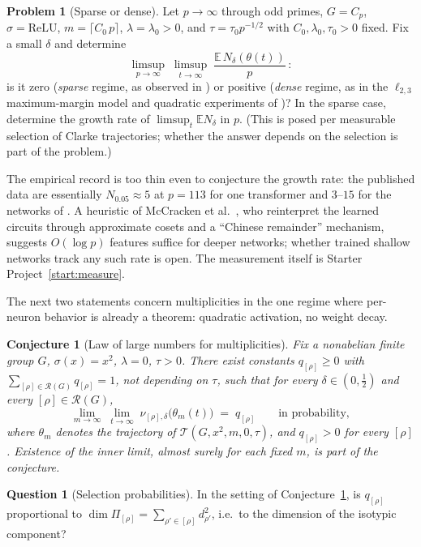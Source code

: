 \documentclass[11pt]{amsart}
\theoremstyle{plain}
\newtheorem{conjecture}[theorem]{Conjecture}
\theoremstyle{definition}
\newtheorem{problem}[theorem]{Problem}
\newtheorem{question}[theorem]{Question}
\newcommand{\E}{\mathbb{E}}
\newcommand{\Rcl}{\mathcal{R}}
\begin{document}
\begin{problem}[Sparse or dense]\label{prob:sparse}
Let $p\to\infty$ through odd primes, $G = C_p$, $\sigma = \mathrm{ReLU}$, $m = \lceil C_0\, p \rceil$, $\lambda = \lambda_0 > 0$, and $\tau = \tau_0 p^{-1/2}$ with $C_0,\lambda_0,\tau_0>0$ fixed. Fix a small $\delta$ and determine
\[
   \limsup_{p \to \infty} \; \limsup_{t \to \infty} \; \frac{\E\, N_\delta(\theta(t))}{p}\,:
\]
is it zero (\emph{sparse} regime, as observed in \cite{nanda2023,chughtai2023}) or positive (\emph{dense} regime, as in the $\ell_{2,3}$ maximum-margin model and quadratic experiments of \cite{morwani2024})? In the sparse case, determine the growth rate of $\limsup_t \E N_\delta$ in $p$. (This is posed per measurable selection of Clarke trajectories; whether the answer depends on the selection is part of the problem.)
\end{problem}

The empirical record is too thin even to conjecture the growth rate: the published data are essentially $N_{0.05} \approx 5$ at $p = 113$ for one transformer \cite{nanda2023} and $3$--$15$ for the networks of \cite{chughtai2023}. A heuristic of McCracken et al.~\cite{mccracken2025}, who reinterpret the learned circuits through approximate cosets and a ``Chinese remainder'' mechanism, suggests $O(\log p)$ features suffice for deeper networks; whether trained shallow networks track any such rate is open. The measurement itself is Starter Project~\ref{start:measure}.

The next two statements concern multiplicities in the one regime where per-neuron behavior is already a theorem: quadratic activation, no weight decay.

\begin{conjecture}[Law of large numbers for multiplicities]\label{conj:lln}
Fix a nonabelian finite group $G$, $\sigma(x) = x^2$, $\lambda = 0$, $\tau > 0$. There exist constants $q_{[\rho]} \geq 0$ with $\sum_{[\rho] \in \Rcl(G)} q_{[\rho]} = 1$, not depending on $\tau$, such that for every $\delta \in (0, \tfrac12)$ and every $[\rho] \in \Rcl(G)$,
\[
   \lim_{m \to \infty} \; \lim_{t \to \infty} \; \nu_{[\rho],\delta}\bigl(\theta_m(t)\bigr) \;=\; q_{[\rho]}
   \qquad \text{in probability},
\]
where $\theta_m$ denotes the trajectory of $\mathcal{T}(G, x^2, m, 0, \tau)$, and $q_{[\rho]} > 0$ for every $[\rho]$. Existence of the inner limit, almost surely for each fixed $m$, is part of the conjecture.
\end{conjecture}

\begin{question}[Selection probabilities]\label{q:dsquared}
In the setting of Conjecture~\ref{conj:lln}, is $q_{[\rho]}$ proportional to $\dim \Pi_{[\rho]} = \sum_{\rho' \in [\rho]} d_{\rho'}^2$, i.e.\ to the dimension of the isotypic component?
\end{question}
\end{document}
